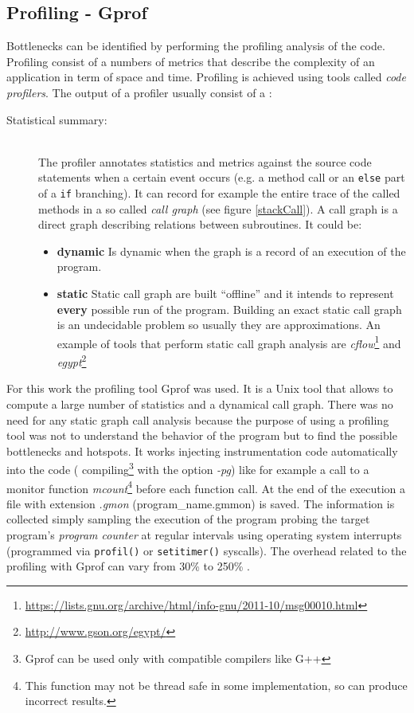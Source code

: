 \subsection{Profiling - Gprof}\label{sect:profiling}
Bottlenecks can be identified by performing the profiling analysis of the code.
Profiling consist of a numbers of metrics that describe the complexity of an
application in term of space and time. Profiling is achieved using tools called
\textit{code profilers}.
The output of a profiler usually consist of a :
\begin{description}
\item[Statistical summary:]\hfill \\
The profiler annotates statistics and metrics against the source
code statements when a certain event occurs (e.g. a method call or an
\texttt{else} part of a \texttt{if} branching). It can record for example the
entire trace of the called methods in a so called \textit{call graph} (see figure \ref{stackCall}). A call
graph is a direct graph describing relations between subroutines. It could be:
\begin{itemize}
  \item \textbf{dynamic}
  Is dynamic when the graph is a record of an execution of the program.
  \item \textbf{static}
  Static call graph are built ``offline'' and it intends to represent
  \textbf{every} possible run of the program. Building an exact static call
  graph is an undecidable problem so usually they are approximations. An
  example of tools that perform static call graph analysis are
  \textit{cflow}\footnote{\url{https://lists.gnu.org/archive/html/info-gnu/2011-10/msg00010.html}}
  and
  \textit{egypt}\footnote{\url{http://www.gson.org/egypt/}}
\end{itemize}
\end{description}

For this work the profiling tool Gprof was used. It is a Unix tool that allows
to compute a large number of statistics and a dynamical call graph. There was no
need for any static graph call analysis because the purpose of using a profiling tool was not to
understand the behavior of the program but to find the possible bottlenecks and
hotspots. It works injecting instrumentation code automatically into the code (
compiling\footnote{Gprof can be used only with compatible compilers like G++}
with the option \textit{-pg}) like for example a call to a monitor function
\textit{mcount}\footnote{This function may not be thread safe in some
implementation, so can produce incorrect results.} before each function call.
At the end of the execution a file with extension \textit{.gmon}
(program\_name.gmmon) is saved.
The information is collected simply sampling the execution of the program
probing the target program's \textit{program counter} at regular intervals using
operating system interrupts (programmed via \texttt{profil()} or
\texttt{setitimer()} syscalls).
The overhead related to the profiling with Gprof can vary from 30\% to 250\%
\cite{Froyd2005}.




